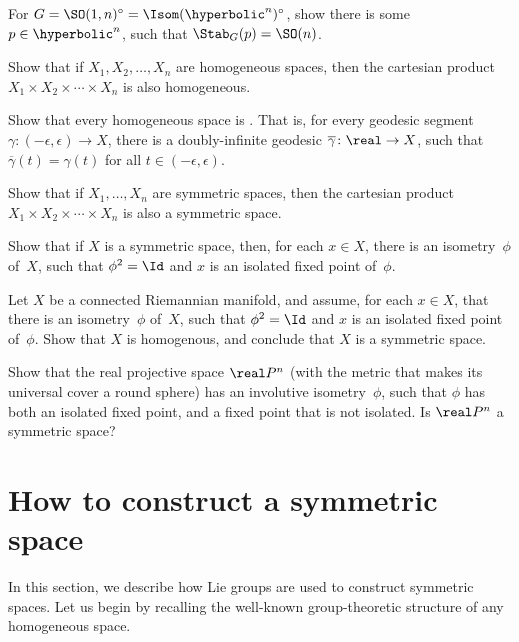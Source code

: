 \begin{exercises}
\item \label{Stab(Hn)} 
 For $G = \SO(1,n)^\circ = \Isom(\hyperbolic^n)^\circ$, show there is
some $p \in \hyperbolic^n$, such that $\Stab_G(p) = \SO(n)$.

\item \label{prod->homog}
 Show that if $X_1,X_2,\ldots,X_n$ are homogeneous spaces, then the
cartesian product $X_1 \times X_2 \times \cdots \times X_n$ is also
homogeneous.

\item Show that every homogeneous space is . That is, for every geodesic segment $\gamma \colon
(-\epsilon, \epsilon) \to X$, there is a doubly-infinite geodesic
$\overline{\gamma} \colon \real \to X$, such that
$\overline{\gamma}(t) = \gamma(t)$ for all $t \in (-\epsilon,
\epsilon)$.

\item Show that if $X_1,\ldots,X_n$ are symmetric spaces, then the
cartesian product $X_1 \times X_2 \times \cdots \times X_n$ is also a
symmetric space.

\item \label{symm->xfixed}
 Show that if $X$ is a symmetric space, then, for each $x \in X$,
there is an isometry~$\phi$ of~$X$, such that $\phi^2 = \Id$ and $x$ is
an isolated fixed point of~$\phi$.

\item \label{xfixed->symm}
 Let $X$ be a connected Riemannian manifold, and assume, for each $x
\in X$, that there is an isometry~$\phi$ of~$X$, such that $\phi^2 =
\Id$ and $x$ is an isolated fixed point of~$\phi$. Show that $X$ is
homogenous, and conclude that $X$ is a symmetric space.

\item Show that the real projective space $\real P^n$ (with the metric
that makes its universal cover a round sphere) has an involutive
isometry~$\phi$, such that $\phi$ has both an isolated fixed point,
and a fixed point that is not isolated. Is $\real P^n$ a symmetric
space?

\end{exercises}



\section{How to construct a symmetric space} \label{ConstructSymm}

In this section, we describe how Lie groups are used to construct
symmetric spaces. Let us begin by recalling the well-known
group-theoretic structure of any homogeneous space.

